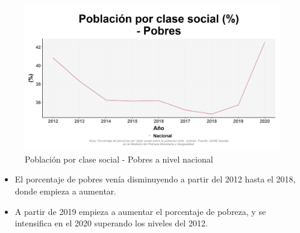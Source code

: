     \begin{figure}[H]
        \caption{Población por clase social - Pobres a nivel nacional \label{map_result_2} }
        \begin{center}
        \includegraphics[width=\textwidth,keepaspectratio]{img/var_242_trend.png}
        \end{center}
    \end{figure}
            \begin{itemize}
                    \item El porcentaje de pobres venía disminuyendo a partir del 2012 hasta el 2018, donde empieza a aumentar.
                    \item A partir de 2019 empieza a aumentar el porcentaje de pobreza, y se intensifica en el 2020 superando los niveles del 2012.
                    \end{itemize}

